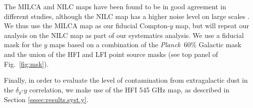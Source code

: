 \documentclass[useAMS,usenatbib]{mn2e}
\def\planck{{\it Planck\/}}
\begin{document}
    The MILCA and NILC maps have been found to be in good agreement in different studies, although the NILC map has a higher noise level on large scales \citep{2016A&A...594A..22P}. We thus use the MILCA map as our fiducial Compton-$y$ map, but will repeat our analysis on the NILC map as part of our systematics analysis. We use a fiducial mask for the $y$ maps based on a combination of the \planck\ 60\% Galactic mask and the union of the HFI and LFI point source masks (see top panel of Fig.\!~\ref{fig:msk}).
    
    Finally, in order to evaluate the level of contamination from extragalactic dust in the $\delta_g$-$y$ correlation, we make use of the HFI 545 GHz map, as described in Section \ref{sssec:results.syst.y}.
    
\end{document}

